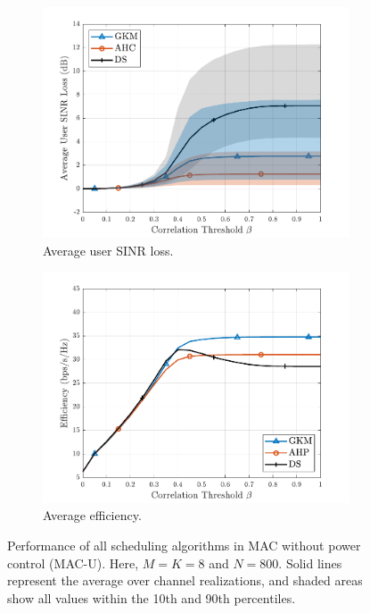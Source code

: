 \begin{figure}[ht]
\centering
\begin{subfigure}{0.48\linewidth}
	\centering
	\includegraphics[width=.95\linewidth]{./figs/usch_figs/MACP_AvgUserSINRLoss_normalizedChannelPwr_PwrCtrl_M8_N800_nSim10_nChannel100_K08_sigman2_-20.pdf}
	\caption{Average user SINR loss.}\label{usch:fig:MACP_sinrLoss_M8_N800}
\end{subfigure}
\begin{subfigure}{0.48\linewidth}
	\centering
	\includegraphics[width=.95\linewidth]{./figs/usch_figs/MACP_NormalizedEfficiency_normalizedChannelPwr_PwrCtrl_M8_N800_nSim10_nChannel100_K08_sigman2_-20.pdf}
	\caption{Average efficiency. }
	\label{usch:fig:MACP_efficiency_M8_N800}
\end{subfigure}
\caption[Performance of all scheduling algorithms in MAC without power control (MAC-U).]{Performance of all scheduling algorithms in MAC without power control (MAC-U). Here, $M=K=8$ and $N=800$. Solid lines represent the average over channel realizations, and shaded areas show all values within the 10th and 90th percentiles.}
\label{usch:fig:MACP_M8_N800}
\end{figure} 


